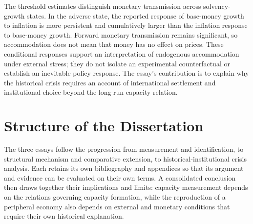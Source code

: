 The threshold estimates distinguish monetary transmission across solvency-growth states. In the adverse state, the reported response of base-money growth to inflation is more persistent and cumulatively larger than the inflation response to base-money growth. Forward monetary transmission remains significant, so accommodation does not mean that money has no effect on prices. These conditional responses support an interpretation of endogenous accommodation under external stress; they do not isolate an experimental counterfactual or establish an inevitable policy response. The essay's contribution is to explain why the historical crisis requires an account of international settlement and institutional choice beyond the long-run capacity relation.

\section*{Structure of the Dissertation}

The three essays follow the progression from measurement and identification, to structural mechanism and comparative extension, to historical-institutional crisis analysis. Each retains its own bibliography and appendices so that its argument and evidence can be evaluated on their own terms. A consolidated conclusion then draws together their implications and limits: capacity measurement depends on the relations governing capacity formation, while the reproduction of a peripheral economy also depends on external and monetary conditions that require their own historical explanation.

\clearpage
{\small
\setlength{\bibsep}{3pt}


}
